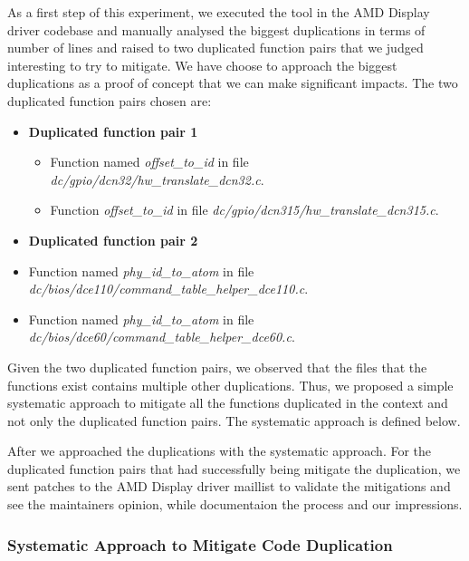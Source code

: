 As a first step of this experiment, we executed the tool in the AMD Display driver codebase and 
manually analysed the biggest duplications in terms of number of lines and raised to 
two duplicated function pairs that we judged interesting to try to mitigate. 
We have choose to approach the biggest duplications as a proof of concept that 
we can make significant impacts. The two duplicated function pairs chosen are:

\begin{itemize}
\item \textbf{Duplicated function pair 1}
\begin{itemize}
\item Function named \textit{offset\_to\_id} in file \textit{dc/gpio/dcn32/hw\_translate\_dcn32.c}.
\item Function \textit{offset\_to\_id} in file \textit{dc/gpio/dcn315/hw\_translate\_dcn315.c}.
\end{itemize}
\item \textbf{Duplicated function pair 2}
\item Function named \textit{phy\_id\_to\_atom} in file \textit{dc/bios/dce110/command\_table\_helper\_dce110.c}.
\item Function named \textit{phy\_id\_to\_atom} in file \textit{dc/bios/dce60/command\_table\_helper\_dce60.c}.
\end{itemize}

Given the two duplicated function pairs, we observed that the files that the functions exist contains 
multiple other duplications. Thus, we proposed a simple systematic approach to mitigate all the 
functions duplicated in the context and not only the duplicated function pairs. 
The systematic approach is defined below.

After we approached the duplications with the systematic approach. For the duplicated function
pairs that had successfully being mitigate the duplication, we sent patches to the AMD Display driver
maillist to validate the mitigations and see the maintainers opinion, while documentaion the process 
and our impressions.

\subsubsection{Systematic Approach to Mitigate Code Duplication}
\label{subsubsec:systematic}


